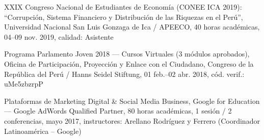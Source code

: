 \begin{scholarship}

  {XXIX Congreso Nacional de Estudiantes de Economía (CONEE ICA 2019):
   ``Corrupción, Sistema Financiero y Distribución de las Riquezas en el Perú'',
   Universidad Nacional San Luis Gonzaga de Ica / APEECO,
   40 horas académicas, 04--09 nov. 2019, calidad: Asistente}


  {Programa Parlamento Joven 2018 --- Cursos Virtuales (3 módulos aprobados),
   Oficina de Participación, Proyección y Enlace con el Ciudadano,
   Congreso de la República del Perú / Hanns Seidel Stiftung,
   01 feb.--02 abr. 2018, cód. verif.: uMe5zbzrpP}



  {Plataformas de Marketing Digital \& Social Media Business,
   Google for Education --- Google AdWords Qualified Partner,
   80 horas académicas, 1 sesión / 2 conferencias, mayo 2017,
   instructores: Arellano Rodríguez y Ferrero (Coordinador Latinoamérica -- Google)}

\end{scholarship}

%
%
